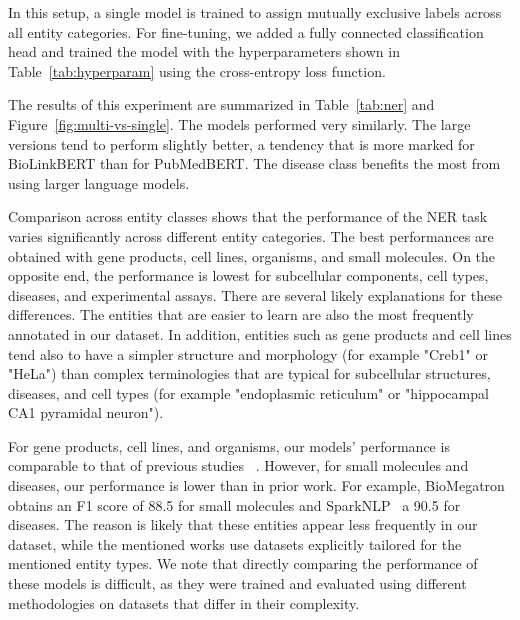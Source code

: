\documentclass{bioinfo}
\begin{document}
In this setup, a single model is trained to assign mutually exclusive labels across all entity categories. For fine-tuning, we added a fully connected classification head and trained the model with the hyperparameters shown in Table~\ref{tab:hyperparam} using the cross-entropy loss function.

The results of this experiment are summarized in Table~\ref{tab:ner} and Figure~\ref{fig:multi-vs-single}. The models performed very similarly. The large versions tend to perform slightly better, a tendency that is more marked for BioLinkBERT than for PubMedBERT. The disease class benefits the most from using larger language models.

Comparison across entity classes shows that the performance of the NER task varies significantly across different entity categories. The best performances are obtained with gene products, cell lines, organisms, and small molecules. On the opposite end, the performance is lowest for subcellular components, cell types, diseases, and experimental assays. There are several likely explanations for these differences. The entities that are easier to learn are also the most frequently annotated in our dataset. In addition, entities such as gene products and cell lines tend also to have a simpler structure and morphology (for example "Creb1" or "HeLa") than complex terminologies that are typical for subcellular structures, diseases, and cell types (for example "endoplasmic reticulum" or "hippocampal CA1 pyramidal neuron"). 

For gene products, cell lines, and organisms, our models' performance is comparable to that of previous studies ~\citep{biored,Sharma2019BioFLAIRPP,jnlpba-a, jnlpba-b,kebiolm}. However, for small molecules and diseases, our performance is lower than in prior work. For example, BioMegatron~\citep{biomegatron} obtains an F1 score of 88.5 for small molecules and SparkNLP~\citep{sparknlp} a 90.5 for diseases. The reason is likely that these entities appear less frequently in our dataset, while the mentioned works use datasets explicitly tailored for the mentioned entity types. We note that directly comparing the performance of these models is difficult, as they were trained and evaluated using different methodologies on datasets that differ in their complexity.
\end{document}
